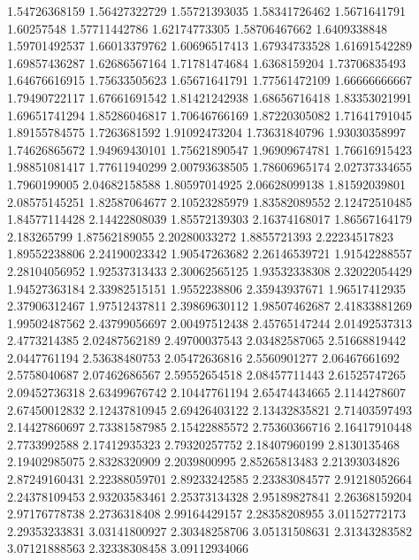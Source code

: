   1.54726368159    1.56427322729
  1.55721393035    1.58341726462
   1.5671641791       1.60257548
  1.57711442786    1.62174773305
  1.58706467662     1.6409338848
  1.59701492537    1.66013379762
  1.60696517413    1.67934733528
  1.61691542289    1.69857436287
  1.62686567164    1.71781474684
   1.6368159204    1.73706835493
  1.64676616915    1.75633505623
  1.65671641791    1.77561472109
  1.66666666667    1.79490722117
  1.67661691542    1.81421242938
  1.68656716418    1.83353021991
  1.69651741294    1.85286046817
  1.70646766169    1.87220305082
  1.71641791045    1.89155784575
   1.7263681592    1.91092473204
  1.73631840796    1.93030358997
  1.74626865672    1.94969430101
  1.75621890547    1.96909674781
  1.76616915423    1.98851081417
  1.77611940299    2.00793638505
  1.78606965174    2.02737334655
   1.7960199005    2.04682158588
  1.80597014925    2.06628099138
  1.81592039801    2.08575145251
  1.82587064677    2.10523285979
  1.83582089552    2.12472510485
  1.84577114428    2.14422808039
  1.85572139303    2.16374168017
  1.86567164179      2.183265799
  1.87562189055    2.20280033272
   1.8855721393    2.22234517823
  1.89552238806    2.24190023342
  1.90547263682    2.26146539721
  1.91542288557    2.28104056952
  1.92537313433    2.30062565125
  1.93532338308    2.32022054429
  1.94527363184    2.33982515151
   1.9552238806    2.35943937671
  1.96517412935    2.37906312467
  1.97512437811    2.39869630112
  1.98507462687    2.41833881269
  1.99502487562    2.43799056697
  2.00497512438    2.45765147244
  2.01492537313     2.4773214385
  2.02487562189    2.49700037543
  2.03482587065    2.51668819442
   2.0447761194    2.53638480753
  2.05472636816     2.5560901277
  2.06467661692     2.5758040687
  2.07462686567    2.59552654518
  2.08457711443    2.61525747265
  2.09452736318    2.63499676742
  2.10447761194    2.65474434665
   2.1144278607    2.67450012832
  2.12437810945    2.69426403122
  2.13432835821    2.71403597493
  2.14427860697    2.73381587985
  2.15422885572    2.75360366716
  2.16417910448     2.7733992588
  2.17412935323    2.79320257752
  2.18407960199     2.8130135468
  2.19402985075     2.8328320909
   2.2039800995    2.85265813483
  2.21393034826    2.87249160431
  2.22388059701    2.89233242585
  2.23383084577    2.91218052664
  2.24378109453    2.93203583461
  2.25373134328    2.95189827841
  2.26368159204    2.97176778738
   2.2736318408    2.99164429157
  2.28358208955    3.01152772173
  2.29353233831    3.03141800927
  2.30348258706    3.05131508631
  2.31343283582    3.07121888563
  2.32338308458    3.09112934066
